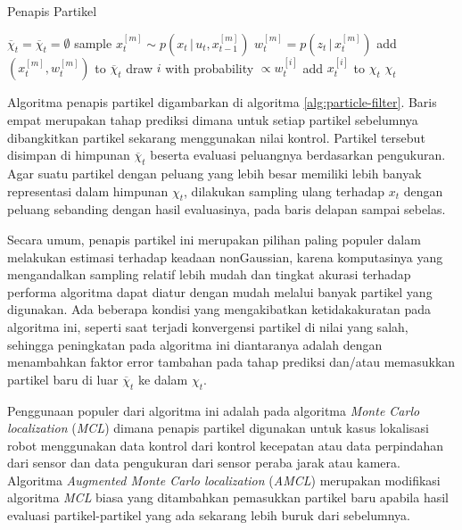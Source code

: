 \begin{algorithm}
    \caption{Penapis Partikel}
    \label{alg:particle-filter}
    \begin{algorithmic}[1]
        \State $\overline{\chi}_t= \overline{\chi}_t = \emptyset$
        \State sample $x_t^{[m]} \sim p(x_t \,|\, u_t, x_{t-1}^{[m]})$
        \State $w_t^{[m]} = p(z_t \,|\, x_t^{[m]})$
        \State add $(x_t^{[m]}, w_t^{[m]})$ to $\overline{\chi}_t$
        \EndFor
        \State draw $i$ with probability $\propto w_t^{[i]}$
        \State add $x_t^{[i]}$ to $\chi_t$
        \EndFor
        \State \Return $\chi_t$
        \EndFunction
    \end{algorithmic}
\end{algorithm}

Algoritma penapis partikel digambarkan di algoritma \ref{alg:particle-filter}. Baris empat merupakan tahap prediksi dimana untuk setiap partikel sebelumnya dibangkitkan partikel sekarang menggunakan nilai kontrol. Partikel tersebut disimpan di himpunan $\overline{\chi}_t$ beserta evaluasi peluangnya berdasarkan pengukuran. Agar suatu partikel dengan peluang yang lebih besar memiliki lebih banyak representasi dalam himpunan $\chi_t$, dilakukan sampling ulang terhadap $x_t$ dengan peluang sebanding dengan hasil evaluasinya, pada baris delapan sampai sebelas.

Secara umum, penapis partikel ini merupakan pilihan paling populer dalam melakukan estimasi terhadap keadaan nonGaussian, karena komputasinya yang mengandalkan sampling relatif lebih mudah dan tingkat akurasi terhadap performa algoritma dapat diatur dengan mudah melalui banyak partikel yang digunakan. Ada beberapa kondisi yang mengakibatkan ketidakakuratan pada algoritma ini, seperti saat terjadi konvergensi partikel di nilai yang salah, sehingga peningkatan pada algoritma ini diantaranya adalah dengan menambahkan faktor error tambahan pada tahap prediksi dan/atau memasukkan partikel baru di luar $\overline{\chi}_t$ ke dalam $\chi_t$.

Penggunaan populer dari algoritma ini adalah pada algoritma \textit{Monte Carlo localization} (\textit{MCL}) dimana penapis partikel digunakan untuk kasus lokalisasi robot menggunakan data kontrol dari kontrol kecepatan atau data perpindahan dari sensor dan data pengukuran dari sensor peraba jarak atau kamera. Algoritma \textit{Augmented Monte Carlo localization} (\textit{AMCL}) merupakan modifikasi algoritma \textit{MCL} biasa yang ditambahkan pemasukkan partikel baru apabila hasil evaluasi partikel-partikel yang ada sekarang lebih buruk dari sebelumnya.

